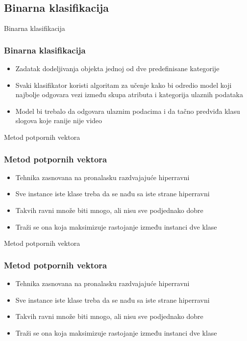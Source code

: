 \documentclass{beamer}
\begin{document}
\subsection{Binarna klasifikacija}
\begin{frame}{Binarna klasifikacija}
	\frametitle{Binarna klasifikacija}
	
	\begin{itemize}
		\item Zadatak dodeljivanja objekta jednoj od dve predefinisane kategorije
		
		\item Svaki klasifikator koristi algoritam za učenje kako bi odredio model koji najbolje odgovara vezi između skupa atributa i kategorija ulaznih podataka
		
		\item Model bi trebalo da odgovara ulaznim podacima i da tačno predviđa klasu slogova koje ranije nije video
	\end{itemize}
	
\end{frame}

\begin{frame}{Metod potpornih vektora}
	\frametitle{Metod potpornih vektora}
	
	\begin{itemize}
		\item Tehnika zasnovana na pronalasku razdvajajuće hiperravni
		\item Sve instance iste klase treba da se nađu sa iste strane hiperravni
		
		\item Takvih ravni množe biti mnogo, ali nisu sve podjednako dobre
		\item Traži se ona koja maksimizuje rastojanje između instanci dve klase
	\end{itemize}
\end{frame}


\begin{frame}{Metod potpornih vektora}
	\frametitle{Metod potpornih vektora}
	
	\begin{itemize}
		\item Tehnika zasnovana na pronalasku razdvajajuće hiperravni
		\item Sve instance iste klase treba da se nađu sa iste strane hiperravni
		
		\item Takvih ravni množe biti mnogo, ali nisu sve podjednako dobre
		\item Traži se ona koja maksimizuje rastojanje između instanci dve klase
	\end{itemize}
\end{frame}
\end{document}
